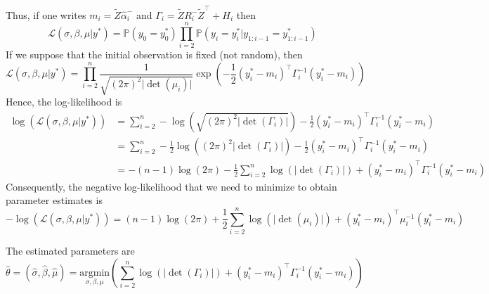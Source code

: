 \documentclass[11pt]{article}
\newcommand {\1}{\mathbb{1}}
\begin{document}
Thus, if one writes $m_i=\tilde{Z} \hat{\alpha}_i^-$ and $\Gamma_i=\tilde{Z} R_i^- \tilde{Z}^\top +H_i$ then 
\[\mathcal{L}(\sigma, \beta, \mu \vert y^*) =\mathbb{P}(y_0=y_0^*) \prod_{i=2}^n \mathbb{P}(y_i=y_i^* \vert y_{1:i-1}=y_{1:i-1}^*)\]
If we suppose that the initial observation is fixed (not random), then
\[\mathcal{L}(\sigma, \beta, \mu \vert y^*) = \prod_{i=2}^n \frac{1}{\sqrt{(2\pi)^2 \vert \det(\mu_i) \vert}} \exp \left( -\frac{1}{2} (y_i^*-m_i)^\top \Gamma_i^{-1} (y_i^*-m_i) \right) \]
Hence, the log-likelihood is 
\begin{align*}
    \log \left(\mathcal{L}(\sigma,\beta,\mu \vert y^*)\right)&=\sum_{i=2}^n -\log(\sqrt{(2\pi)^2 \vert \det(\Gamma_i) \vert}) -\frac{1}{2} (y^*_i-m_i)^\top \Gamma_i^{-1} (y^*_i-m_i)\\
    &=\sum_{i=2}^n -\frac{1}{2}\log\left((2\pi)^2 \vert \det(\Gamma_i) \vert\right) -\frac{1}{2} (y^*_i-m_i)^\top \Gamma_i^{-1} (y^*_i-m_i) \\
    &=-(n-1)\log(2\pi)-\frac{1}{2} \sum_{i=2}^n \log(\vert \det(\Gamma_i) \vert) +(y^*_i-m_i)^\top \Gamma_i^{-1} (y^*_i-m_i)
\end{align*}
Consequently, the negative log-likelihood that we need to minimize to obtain parameter estimates is 
\[
-\log \left(\mathcal{L}(\sigma,\beta,\mu \vert y^*)\right)=(n-1)\log(2\pi)+\frac{1}{2} \sum_{i=2}^n \log(\vert \det(\mu_i) \vert) +(y^*_i-m_i)^\top \mu_i^{-1} (y^*_i-m_i)
\]

The estimated parameters are 
\[\hat{\theta}=(\hat{\sigma},\hat{\beta},\hat{\mu})=\underset{\sigma,\beta,\mu}{\mathrm{argmin}} \left( \sum_{i=2}^n \log(\vert \det(\Gamma_i) \vert) +(y^*_i-m_i)^\top \Gamma_i^{-1} (y^*_i-m_i) \right) \]
\end{document}
